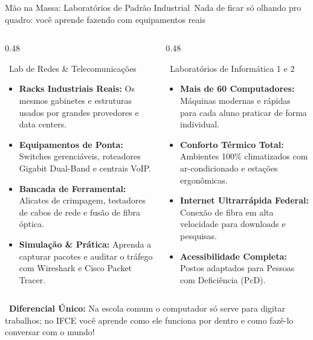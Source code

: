 
\begin{frame}{Mão na Massa: Laboratórios de Padrão Industrial}{\faMicrochip\ Nada de ficar só olhando pro quadro: você aprende fazendo com equipamentos reais}
  \begin{columns}[t]
    \begin{column}{0.48\textwidth}
      \begin{greencard}{\faNetworkWired\ Lab de Redes \& Telecomunicações}
        \tiny
        \begin{itemize}\setlength{\itemsep}{0.18em}
          \item \textbf{Racks Industriais Reais:} Os mesmos gabinetes e estruturas usados por grandes provedores e data centers.
          \item \textbf{Equipamentos de Ponta:} Switches gerenciáveis, roteadores Gigabit Dual-Band e centrais VoIP.
          \item \textbf{Bancada de Ferramental:} Alicates de crimpagem, testadores de cabos de rede e fusão de fibra óptica.
          \item \textbf{Simulação \& Prática:} Aprenda a capturar pacotes e auditar o tráfego com Wireshark e Cisco Packet Tracer.
        \end{itemize}
      \end{greencard}
    \end{column}
    
    \begin{column}{0.48\textwidth}
      \begin{bluecard}{\faDesktop\ Laboratórios de Informática 1 e 2}
        \tiny
        \begin{itemize}\setlength{\itemsep}{0.18em}
          \item \textbf{Mais de 60 Computadores:} Máquinas modernas e rápidas para cada aluno praticar de forma individual.
          \item \textbf{Conforto Térmico Total:} Ambientes 100\% climatizados com ar-condicionado e estações ergonômicas.
          \item \textbf{Internet Ultrarrápida Federal:} Conexão de fibra em alta velocidade para downloads e pesquisas.
          \item \textbf{Acessibilidade Completa:} Postos adaptados para Pessoas com Deficiência (PcD).
        \end{itemize}
      \end{bluecard}
    \end{column}
  \end{columns}
  
  \vspace{0.08cm}
  \begin{statcard}
    \tiny \textcolor{IFCEDarkGreen}{\faCheckCircle\ \textbf{Diferencial Único:} Na escola comum o computador só serve para digitar trabalhos; no IFCE você aprende como ele funciona por dentro e como fazê-lo conversar com o mundo!}
  \end{statcard}
\end{frame}

